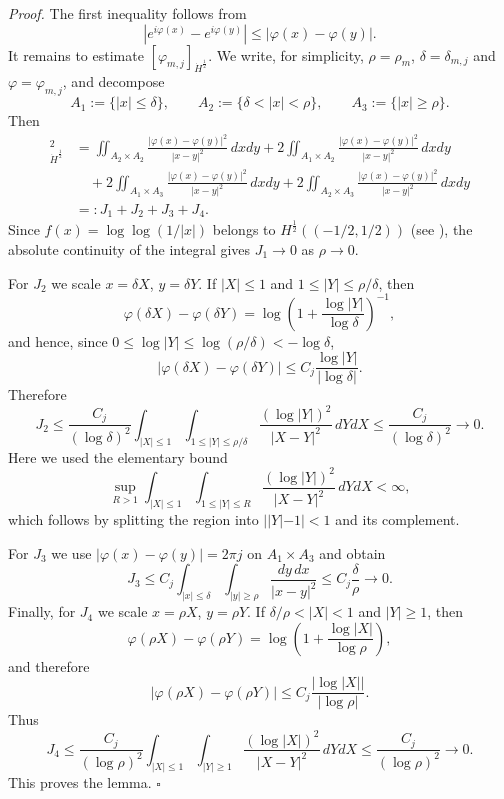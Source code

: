 \documentclass[12pt, a4paper]{article}
\newenvironment{proof}{\noindent\emph{Proof.}}{\hfill$\square$\medskip}
\renewcommand{\(}{\left(}
\renewcommand{\)}{\right)}
\begin{document}
\begin{proof}
The first inequality follows from
\[
|e^{i\varphi(x)}-e^{i\varphi(y)}|\le |\varphi(x)-\varphi(y)|.
\]
It remains to estimate $[\varphi_{m,j}]_{\dot H^{\frac12}}$. We write, for simplicity, $\rho=\rho_m$, $\delta=\delta_{m,j}$ and $\varphi=\varphi_{m,j}$, and decompose
\[
A_1:=\{|x|\le\delta\},\qquad
A_2:=\{\delta<|x|<\rho\},\qquad
A_3:=\{|x|\ge\rho\}.
\]
Then
\begin{align*}
[\varphi]_{\dot H^{\frac12}}^2
&=\iint_{A_2\times A_2}\frac{|\varphi(x)-\varphi(y)|^2}{|x-y|^2}\,dxdy
+2\iint_{A_1\times A_2}\frac{|\varphi(x)-\varphi(y)|^2}{|x-y|^2}\,dxdy\\
&\quad+2\iint_{A_1\times A_3}\frac{|\varphi(x)-\varphi(y)|^2}{|x-y|^2}\,dxdy
+2\iint_{A_2\times A_3}\frac{|\varphi(x)-\varphi(y)|^2}{|x-y|^2}\,dxdy\\
&=:J_1+J_2+J_3+J_4.
\end{align*}
Since $f(x)=\log\log(1/|x|)$ belongs to $H^{\frac12}((-1/2,1/2))$ (see \cite[Lemma A.9]{HM}), the absolute continuity of the integral gives $J_1\to0$ as $\rho\to0$.

For $J_2$ we scale $x=\delta X$, $y=\delta Y$. If $|X|\le1$ and $1\le |Y|\le \rho/\delta$, then
\[
\varphi(\delta X)-\varphi(\delta Y)
=\log\left(1+\frac{\log |Y|}{\log\delta}\right)^{-1},
\]
and hence, since $0\le \log |Y|\le \log(\rho/\delta)<-\log\delta$,
\[
|\varphi(\delta X)-\varphi(\delta Y)|
\le C_j\frac{\log |Y|}{|\log\delta|}.
\]
Therefore
\[
J_2\le
\frac{C_j}{(\log\delta)^2}
\int_{|X|\le1}\int_{1\le |Y|\le \rho/\delta}
\frac{(\log |Y|)^2}{|X-Y|^2}\,dYdX
\le \frac{C_j}{(\log\delta)^2}\to0.
\]
Here we used the elementary bound
\[
\sup_{R>1}\int_{|X|\le1}\int_{1\le |Y|\le R}
\frac{(\log |Y|)^2}{|X-Y|^2}\,dYdX<\infty,
\]
which follows by splitting the region into $||Y|-1|<1$ and its complement.

For $J_3$ we use $|\varphi(x)-\varphi(y)|=2\pi j$ on $A_1\times A_3$ and obtain
\[
J_3\le C_j\int_{|x|\le\delta}\int_{|y|\ge\rho}\frac{dy\,dx}{|x-y|^2}
\le C_j\frac{\delta}{\rho}\to0.
\]
Finally, for $J_4$ we scale $x=\rho X$, $y=\rho Y$. If $\delta/\rho<|X|<1$ and $|Y|\ge1$, then
\[
\varphi(\rho X)-\varphi(\rho Y)
=\log\left(1+\frac{\log |X|}{\log\rho}\right),
\]
and therefore
\[
|\varphi(\rho X)-\varphi(\rho Y)|
\le C_j\frac{|\log |X||}{|\log\rho|}.
\]
Thus
\[
J_4\le
\frac{C_j}{(\log\rho)^2}
\int_{|X|\le1}\int_{|Y|\ge1}
\frac{(\log |X|)^2}{|X-Y|^2}\,dYdX
\le \frac{C_j}{(\log\rho)^2}\to0.
\]
This proves the lemma.
\end{proof}
\end{document}
